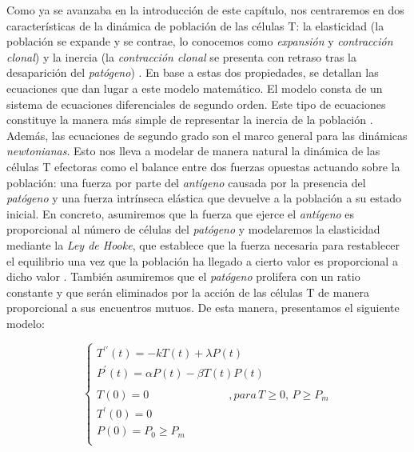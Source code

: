 Como ya se avanzaba en la introducción de este capítulo, nos centraremos en dos características de la dinámica de población de las células T: la elasticidad (la población se expande y se contrae, lo conocemos como \textit{expansión} y \textit{contracción clonal}) y la inercia (la \textit{contracción clonal} se presenta con retraso tras la desaparición del \textit{patógeno}) \citep{arias2015growth}. En base a estas dos propiedades, se detallan las ecuaciones que dan lugar a este modelo matemático. El modelo consta de un sistema de ecuaciones diferenciales de segundo orden. Este tipo de ecuaciones constituye la manera más simple de representar la inercia de la población \citep{arias2015growth}. Además, las ecuaciones de segundo grado son el marco general para las dinámicas \textit{newtonianas}. Esto nos lleva a modelar de manera natural la dinámica de las células T efectoras como el balance entre dos fuerzas opuestas actuando sobre la población: una fuerza por parte del \textit{antígeno} causada por la presencia del \textit{patógeno} y una fuerza intrínseca elástica que devuelve a la población a su estado inicial. En concreto, asumiremos que la fuerza que ejerce el \textit{antígeno} es proporcional al número de células del \textit{patógeno} y modelaremos la elasticidad mediante la \textit{Ley de Hooke}, que establece que la fuerza necesaria para restablecer el equilibrio una vez que la población ha llegado a cierto valor es proporcional a dicho valor \citep{arias2015growth}. También asumiremos que el \textit{patógeno} prolifera con un ratio constante y que serán eliminados por la acción de las células T de manera proporcional a sus encuentros mutuos. De esta manera, presentamos el siguiente modelo:

\begin{equation}
	\label{sist_macro}
	\left\{ \begin{array}{l}
	{T^{\prime\prime}}(t) = -kT(t) + \lambda P(t) \\
	{P^{\prime}}(t) = \alpha P(t) - \beta T(t)P(t) \\
	\\
	T(0)=0 \hspace{3cm} ,para\, T \geq 0,\, P \geq P_m \\
	T^{\prime}(0)=0  \\
	P(0)=P_0 \geq P_m  \\ 
	\end{array}
	\right.
\end{equation}

